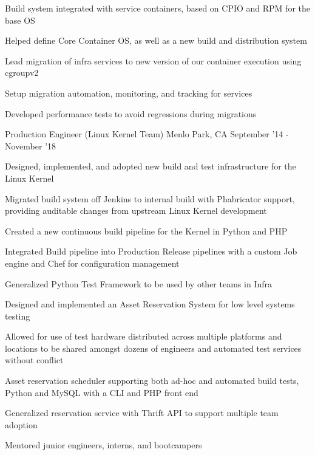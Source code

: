 \begin{cventries}
{\begin{cvitems}
          \item Build system integrated with service containers, based on CPIO and RPM for the base OS
          \item Helped define Core Container OS, as well as a new build and distribution system
		  \item Lead migration of infra services to new version of our container execution using cgroupv2
		  \item Setup migration automation, monitoring, and tracking for services 
		  \item Developed performance tests to avoid regressions during migrations
        \end{cvitems}
    }
\vspace{2mm}
\cventry
	{Production Engineer \color{solarized-orange}(Linux Kernel Team)} %
    {} %
    {Menlo Park, CA} %
    {September '14 - November '18} %
    {
        \begin{cvitems}
          \item Designed, implemented, and adopted new build and test infrastructure for the Linux Kernel
          \item Migrated build system off Jenkins to internal build with Phabricator support, providing auditable changes from upstream Linux Kernel development
          \item Created a new continuous build pipeline for the Kernel in Python and PHP 
          \item Integrated Build pipeline into Production Release pipelines with a custom Job engine and Chef for configuration management
          \item Generalized Python Test Framework to be used by other teams in Infra
          \item Designed and implemented an Asset Reservation System for low level systems testing
          \item Allowed for use of test hardware distributed across multiple platforms and locations to be shared amongst dozens of engineers and automated test services without conflict 
          \item Asset reservation scheduler supporting both ad-hoc and automated build tests, Python and MySQL with a CLI and PHP front end
          \item Generalized reservation service with Thrift API to support multiple team adoption
          \item Mentored junior engineers, interns, and bootcampers

\end{cvitems}}
\end{cventries}
